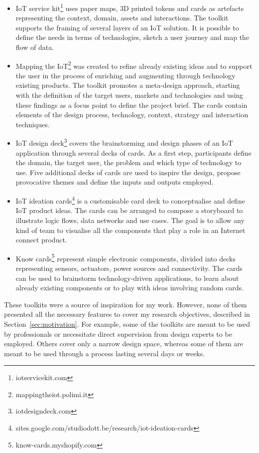 \begin{itemize}
    \item IoT service kit\footnote{iotservicekit.com} uses paper maps, 3D printed tokens and cards as artefacts representing the context, domain, assets and interactions. The toolkit supports the framing of several layers of an IoT solution. It is possible to define the needs in terms of technologies, sketch a user journey and map the flow of data.
    \item Mapping the IoT\footnote{mappingtheiot.polimi.it} was created to refine already existing ideas and to support the user in the process of enriching and augmenting through technology existing products. The toolkit promotes a meta-design approach, starting with the definition of the target users, markets and technologies and using these findings as a focus point to define the project brief. The cards contain elements of the design process, technology, context, strategy and interaction techniques.
    \item IoT design deck\footnote{iotdesigndeck.com} covers the brainstorming and design phases of an IoT application through several decks of cards. As a first step, participants define the domain, the target user, the problem and which type of technology to use. Five additional decks of cards are used to inspire the design, propose provocative themes and define the inputs and outputs employed.
    \item IoT ideation cards\footnote{sites.google.com/studiodott.be/research/iot-ideation-cards} is a customisable card deck to conceptualise and define IoT product ideas. The cards can be arranged to compose a storyboard to illustrate logic flows, data networks and use cases. The goal is to allow any kind of team to visualise all the components that play a role in an Internet connect product.
    \item Know cards\footnote{know-cards.myshopify.com} represent simple electronic components, divided into decks representing sensors, actuators, power sources and connectivity. The cards can be used to brainstorm technology-driven applications, to learn about already existing components or to play with ideas involving random cards.
\end{itemize}

These toolkits were a source of inspiration for my work. However, none of them presented all the necessary features to cover my research objectives, described in Section~\ref{sec:motivation}. For example, some of the toolkits are meant to be used by professionals or necessitate direct supervision from design experts to be employed. Others cover only a narrow design space, whereas some of them are meant to be used through a process lasting several days or weeks.
